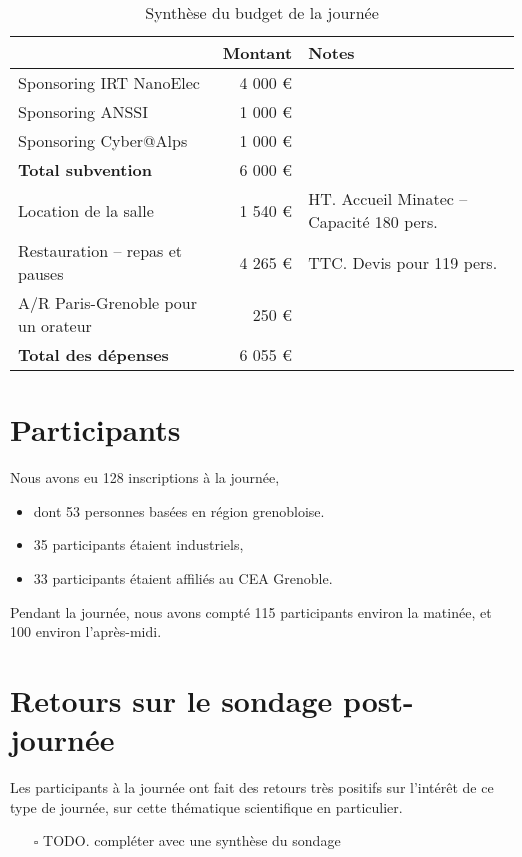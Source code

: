 \documentclass[a4paper,11pt]{article}
\begin{document}
\begin{table}[h]
\caption{\label{tab:orgf880e4e}
Synthèse du budget de la journée}
\centering
\begin{tabular}{lrl}
\hline
 & Montant & Notes\\
\hline
Sponsoring IRT NanoElec & 4 000 € & \\
Sponsoring ANSSI & 1 000 € & \\
Sponsoring Cyber@Alps & 1 000 € & \\
\hline
\textbf{Total subvention} & 6 000 € & \\
\hline
\hline
Location de la salle & 1 540 € & HT. Accueil Minatec – Capacité 180 pers.\\
Restauration – repas et pauses & 4 265 € & TTC. Devis pour 119 pers.\\
A/R Paris-Grenoble pour un orateur & 250 € & \\
\hline
\textbf{Total des dépenses} & 6 055 € & \\
\hline
\end{tabular}
\end{table}

\section{Participants}
\label{sec:org95137d4}

Nous avons eu 128 inscriptions à la journée,

\begin{itemize}
\item dont 53 personnes basées en région grenobloise.
\item 35 participants étaient industriels,
\item 33 participants étaient affiliés au CEA Grenoble.
\end{itemize}

Pendant la journée, nous avons compté 115 participants environ la
matinée, et 100 environ l'après-midi.

\section{Retours sur le sondage post-journée}
\label{sec:org3fff184}

Les participants à la journée ont fait des retours très positifs sur
l'intérêt de ce type de journée, sur cette thématique scientifique en
particulier.


\begin{itemize}
\item[{$\square$}] TODO.  compléter avec une synthèse du sondage
\end{itemize}
\end{document}
